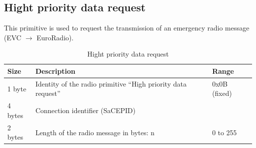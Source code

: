 \documentclass[nocc]{template/openetcs_report}
\begin{document}
\subsection{Hight priority data request}
This primitive is used to request the transmission of an emergency radio message (EVC $\rightarrow$ EuroRadio).
 			\begin{longtable}{|l|l|l|}
				\caption{Hight priority data request}\\ 
				\hline
				
					\begin{minipage}[t]{0.1\linewidth} \textbf{Size}	\end{minipage}
				&	\begin{minipage}[t]{0.5\linewidth} \textbf{Description}	\end{minipage}
				&	\begin{minipage}[t]{0.3\linewidth} \textbf{Range} \end{minipage} \\
				
				\hline
					 \begin{minipage}[t]{0.1\linewidth}1 byte \end{minipage}
					&\begin{minipage}[t]{0.6\linewidth}Identity of the radio primitive "`High priority data request"'	\end{minipage}
					&\begin{minipage}[t]{0.3\linewidth}0x0B (fixed) \end{minipage} \\
					
				\hline
					 \begin{minipage}[t]{0.1\linewidth}4 bytes \end{minipage}
					&\begin{minipage}[t]{0.6\linewidth}Connection identifier (SaCEPID)	\end{minipage}
					&\begin{minipage}[t]{0.3\linewidth} \end{minipage} \\
					
				\hline
					 \begin{minipage}[t]{0.1\linewidth}2 bytes \end{minipage}
					&\begin{minipage}[t]{0.6\linewidth}Length of the radio message in bytes: n	\end{minipage}
					&\begin{minipage}[t]{0.3\linewidth}0 to 255 \end{minipage} \\
					

\end{longtable}
\end{document}
